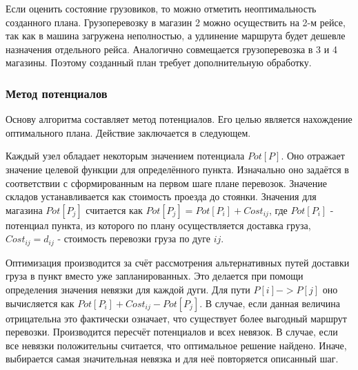  	Если оценить состояние грузовиков, то можно отметить неоптимальность созданного плана. Грузоперевозку в магазин 2 можно осуществить на 2-м рейсе, так как в машина загружена неполностью, а удлинение маршрута будет дешевле назначения отдельного рейса. Аналогично совмещается грузоперевозка в 3 и 4 магазины. Поэтому созданный план требует дополнительную обработку.
	
	\subsubsection{Метод потенциалов}
	Основу алгоритма составляет метод потенциалов. Его целью является нахождение оптимального плана\cite{potential}. Действие заключается в следующем.
	
	Каждый узел обладает некоторым значением потенциала $Pot[P]$. Оно отражает значение целевой функции для определённого пункта. Изначально оно задаётся в соответствии с сформированным на первом шаге плане перевозок. Значение складов устанавливается как стоимость проезда до стоянки. Значения для магазина $Pot[P_j]$ считается как $Pot[P_j] = Pot[P_i] + Cost_{ij}$, где $Pot[P_i]$ - потенциал пункта, из которого по плану осуществляется доставка груза, $Cost_{ij} = d_{ij}$ - стоимость перевозки груза по дуге $ij$.
	
	Оптимизация производится за счёт рассмотрения альтернативных путей доставки груза в пункт вместо уже запланированных. Это делается при помощи определения значения невязки для каждой дуги. Для пути $P[i] -> P[j]$ оно вычисляется как $Pot[P_i] + Cost_{ij}-Pot[P_j]$. В случае, если данная величина отрицательна это фактически означает, что существует более выгодный маршрут перевозки. Производится пересчёт потенциалов и всех невязок. В случае, если все невязки положительны считается, что оптимальное решение найдено. Иначе, выбирается самая значительная невязка и для неё повторяется описанный шаг.
	
